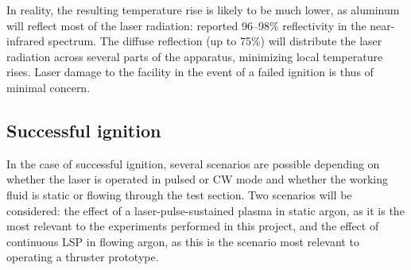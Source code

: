             In reality, the resulting temperature rise is likely to be much lower, as aluminum will reflect most of the laser radiation: \textcite{pozzobonHouseholdAluminumFoil2020} reported 96--98\% reflectivity in the near-infrared spectrum. The diffuse reflection (up to 75\%) will distribute the laser radiation across several parts of the apparatus, minimizing local temperature rises. Laser damage to the facility in the event of a failed ignition is thus of minimal concern.

        \subsection{Successful ignition}
            In the case of successful ignition, several scenarios are possible depending on whether the laser is operated in pulsed or CW mode and whether the working fluid is static or flowing through the test section. Two scenarios will be considered: the effect of a laser-pulse-sustained plasma in static argon, as it is the most relevant to the experiments performed in this project, and the effect of continuous LSP in flowing argon, as this is the scenario most relevant to operating a thruster prototype.


